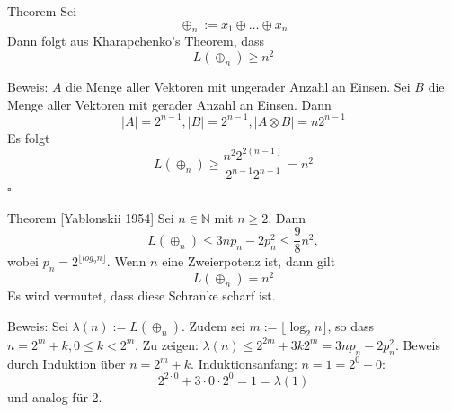 \begin{frame}
    \begin{block}{Theorem}
        Sei
        \[
            \oplus_n := x_1 \oplus \dots \oplus x_n
        \]
        Dann folgt aus Kharapchenko's Theorem, dass
        \[
            L(\oplus_n) \geq n^2
        \]
    \end{block}
\end{frame}

\begin{frame}[t]
    Beweis:
    \newline
    \newline
    $A$ die Menge aller Vektoren mit ungerader Anzahl an Einsen.
    \newline
    Sei $B$ die Menge aller Vektoren mit gerader Anzahl an Einsen.
    \pause
    \newline
    Dann
    \[
        |A| = 2^{n-1}, |B| = 2^{n-1}, |A\otimes B| = n2^{n-1}
    \]
    \pause
    Es folgt
    \[
        L(\oplus_n) \geq \frac{n^2 2^{2(n-1)}}{2^{n-1}2^{n-1}} = n^2
    \]
    \hfill $\square$
\end{frame}

\begin{frame}
    \begin{block}{Theorem [Yablonskii 1954]}
        Sei $n \in \mathbb{N}$ mit $n \geq 2$. Dann
        \[
            L(\oplus_n) \leq 3np_n - 2p_n^2 \leq \frac{9}{8}n^2,
        \]
        wobei $p_n = 2^{\lfloor log_2n\rfloor}$.
        \newline
        \newline
        Wenn $n$ eine Zweierpotenz ist, dann gilt
        \[
            L(\oplus_n) = n^2
        \]
        \newline
        \newline
        Es wird vermutet, dass diese Schranke scharf ist.
    \end{block}
\end{frame}

\begin{frame}[t]
    Beweis:
    \newline
    \newline
    Sei $\lambda(n) := L(\oplus_n)$. 
    \newline
    Zudem sei $m := \lfloor \log_2 n \rfloor$, so dass $n = 2^m + k, 0 \leq k < 2^m$.
    \newline
    \newline
    \pause
    Zu zeigen: $\lambda(n) \leq 2^{2m} + 3k2^m = 3n p_n - 2 p_n^2$.
    \newline
    \newline
    \pause
    Beweis durch Induktion über $n = 2^m + k$. 
    \newline
    \newline
    Induktionsanfang: $n = 1 = 2^0 + 0$:
    \pause
    \[
        2^{2 \cdot 0} + 3 \cdot 0 \cdot 2^0 = 1 = \lambda(1) 
    \]
    und analog für 2.
\end{frame}{}


